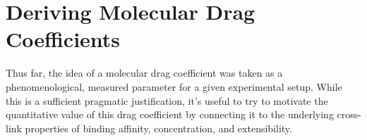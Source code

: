 \documentclass[pre,preprint]{revtex4-1}
\begin{document}

\section{Deriving Molecular Drag Coefficients}
\label{app:drag}
Thus far, the idea of a molecular drag coefficient was taken as a phenomenological, measured parameter for a given experimental setup.  While this is a sufficient pragmatic justification, it's useful to try to motivate the quantitative value of this drag coefficient by connecting it to the underlying cross-link properties of binding affinity, concentration, and extensibility.
\end{document}
